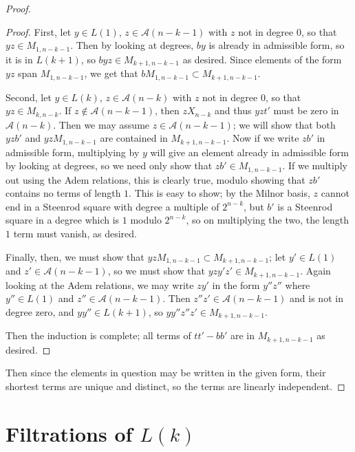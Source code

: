 \documentclass{article}
\newcommand{\A}{\mathcal{A}}
\begin{document}
\begin{proof}
\begin{proof}
  First, let $y\in L(1)$, $z\in \A(n-k-1)$ with $z$ not in degree $0$, so that $yz\in M_{1,n-k-1}$.  Then by looking at degrees, $by$ is already in admissible form, so it is in $L(k+1)$, so $byz\in M_{k+1,n-k-1}$ as desired.  Since elements of the form $yz$ span $M_{1,n-k-1}$, we get that $bM_{1,n-k-1}\subset M_{k+1,n-k-1}$.

  Second, let $y\in L(k)$, $z\in \A(n-k)$ with $z$ not in degree $0$, so that $yz\in M_{k,n-k}$.  If $z\not\in\A(n-k-1)$, then $zX_{n-k}$ and thus $yzt'$ must be zero in $\A(n-k)$.  Then we may assume $z\in\A(n-k-1)$; we will show that both $yzb'$ and $yzM_{1,n-k-1}$ are contained in $M_{k+1,n-k-1}$.  Now if we write $zb'$ in admissible form, multiplying by $y$ will give an element already in admissible form by looking at degrees, so we need only show that $zb'\in M_{1,n-k-1}$.  If we multiply out using the Adem relations, this is clearly true, modulo showing that $zb'$ contains no terms of length $1$.  This is easy to show; by the Milnor basis, $z$ cannot end in a Steenrod square with degree a multiple of $2^{n-k}$, but $b'$ is a Steenrod square in a degree which is $1$ modulo $2^{n-k}$, so on multiplying the two, the length $1$ term must vanish, as desired.

  Finally, then, we must show that $yzM_{1,n-k-1}\subset M_{k+1,n-k-1}$; let $y'\in L(1)$ and $z'\in\A(n-k-1)$, so we must show that $yzy'z'\in M_{k+1,n-k-1}$.  Again looking at the Adem relations, we may write $zy'$ in the form $y''z''$ where $y''\in L(1)$ and $z''\in\A(n-k-1)$.  Then $z''z'\in \A(n-k-1)$ and is not in degree zero, and $yy''\in L(k+1)$, so $yy''z''z'\in M_{k+1,n-k-1}$.

  Then the induction is complete; all terms of $tt'-bb'$ are in $M_{k+1,n-k-1}$ as desired.
  \end{proof}

  Then since the elements in question may be written in the given form, their shortest terms are unique and distinct, so the terms are linearly independent.
\end{proof}

\section{Filtrations of \boldmath$L(k)$}
\end{document}
